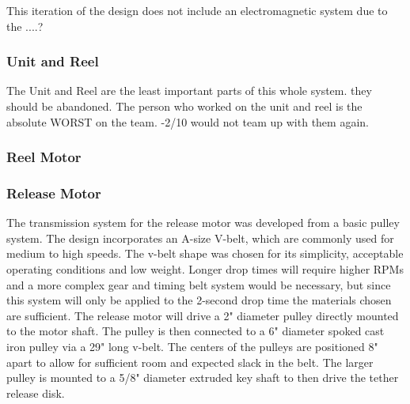  

This iteration of the design does not include an electromagnetic system due to the ....?


\subsubsection{Unit and Reel}The Unit and Reel are the least important parts of this whole system. they should be abandoned. The person who worked on the unit and reel is the absolute WORST on the team. -2/10 would not team up with them again.

\subsubsection{Reel Motor}

\subsubsection{Release Motor}

The transmission system for the release motor was developed from a basic pulley system. The design incorporates an A-size V-belt, which are commonly used for medium to high speeds. The v-belt shape was chosen for its simplicity, acceptable operating conditions and low weight. Longer drop times will require higher RPMs and a more complex gear and timing belt system would be necessary, but since this system will only be applied to the 2-second drop time the materials chosen are sufficient. The release motor will drive a 2" diameter pulley directly mounted to the motor shaft. The pulley is then connected to a 6" diameter spoked cast iron pulley via a 29" long v-belt. The centers of the pulleys are positioned 8" apart to allow for sufficient room and expected slack in the belt. The larger pulley is mounted to a 5/8" diameter extruded key shaft to then drive the tether release disk.

